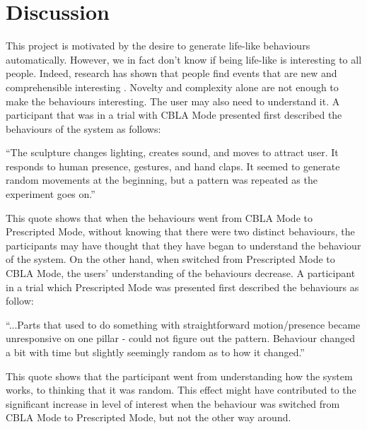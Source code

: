 \section{Discussion}


This project is motivated by the desire to generate life-like behaviours automatically. However, we in fact don't know if being life-like is interesting to all people. Indeed, research has shown that people find events that are new and comprehensible interesting \cite{Silvia2008}. Novelty and complexity alone are not enough to make the behaviours interesting. The user may also need to understand it. A participant that was in a trial with CBLA Mode presented first described the behaviours of the system as follows: 
\begin{blockquote}
``The sculpture changes lighting, creates sound, and moves to attract user. It responds to human presence, gestures, and hand claps. It seemed to generate random movements at the beginning, but a pattern was repeated as the experiment goes on.''
\end{blockquote}
This quote shows that when the behaviours went from CBLA Mode to Prescripted Mode, without knowing that there were two distinct behaviours, the participants may have thought that they have began to understand the behaviour of the system. On the other hand, when switched from Prescripted Mode to CBLA Mode, the users' understanding of the behaviours decrease. A participant in a trial which Prescripted Mode was presented first described the behaviours as follow:
\begin{blockquote}
	``...Parts that used to do something with straightforward motion/presence became unresponsive on one pillar - could not figure out the pattern. Behaviour changed a bit with time but slightly seemingly random as to how it changed.''
\end{blockquote}
This quote shows that the participant went from understanding how the system works, to thinking that it was random. This effect might have contributed to the significant increase in level of interest when the behaviour was switched from CBLA Mode to Prescripted Mode, but not the other way around.

